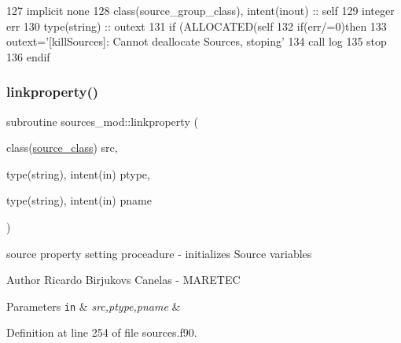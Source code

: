 \begin{DoxyCode}
127     \textcolor{keywordtype}{implicit none}
128     \textcolor{keywordtype}{class}(source\_group\_class), \textcolor{keywordtype}{intent(inout)} :: self
129     \textcolor{keywordtype}{integer} err
130     \textcolor{keywordtype}{type}(string) :: outext
131     \textcolor{keywordflow}{if} (\textcolor{keyword}{ALLOCATED}(self%
132     \textcolor{keywordflow}{if}(err/=0)\textcolor{keywordflow}{then}
133         outext=\textcolor{stringliteral}{'[killSources]: Cannot deallocate Sources, stoping'}
134         \textcolor{keyword}{call }log%
135         stop    
136 \textcolor{keywordflow}{    endif}
\end{DoxyCode}
\mbox{\label{namespacesources__mod_a683ca7e4aca7a0050aad9f506569fca9}} 
\subsubsection{\texorpdfstring{linkproperty()}{linkproperty()}}
{\footnotesize\ttfamily subroutine sources\+\_\+mod\+::linkproperty (\begin{DoxyParamCaption}\item[{class(\mbox{\hyperlink{structsources__mod_1_1source__class}{source\+\_\+class}})}]{src,  }\item[{type(string), intent(in)}]{ptype,  }\item[{type(string), intent(in)}]{pname }\end{DoxyParamCaption})\hspace{0.3cm}{\ttfamily [private]}}



source property setting proceadure -\/ initializes Source variables 

\begin{DoxyAuthor}{Author}
Ricardo Birjukovs Canelas -\/ M\+A\+R\+E\+T\+EC
\end{DoxyAuthor}

\begin{DoxyParams}[1]{Parameters}
\mbox{\tt in}  & {\em src,ptype,pname} & \\
\hline
\end{DoxyParams}


Definition at line 254 of file sources.\+f90.


